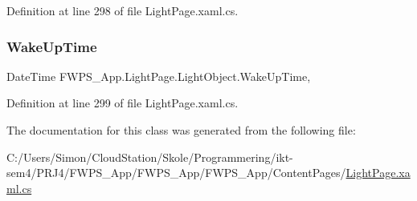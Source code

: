 Definition at line 298 of file Light\+Page.\+xaml.\+cs.

\mbox{\label{class_f_w_p_s___app_1_1_light_page_1_1_light_object_a9b9e2d8c8fbe32eac770fd343a4d0384}} 
\subsubsection{\texorpdfstring{Wake\+Up\+Time}{WakeUpTime}}
{\footnotesize\ttfamily Date\+Time F\+W\+P\+S\+\_\+\+App.\+Light\+Page.\+Light\+Object.\+Wake\+Up\+Time\hspace{0.3cm}{\ttfamily [get]}, {\ttfamily [set]}}



Definition at line 299 of file Light\+Page.\+xaml.\+cs.



The documentation for this class was generated from the following file\+:\begin{DoxyCompactItemize}
\item 
C\+:/\+Users/\+Simon/\+Cloud\+Station/\+Skole/\+Programmering/ikt-\/sem4/\+P\+R\+J4/\+F\+W\+P\+S\+\_\+\+App/\+F\+W\+P\+S\+\_\+\+App/\+F\+W\+P\+S\+\_\+\+App/\+Content\+Pages/\mbox{\hyperlink{_light_page_8xaml_8cs}{Light\+Page.\+xaml.\+cs}}\end{DoxyCompactItemize}
